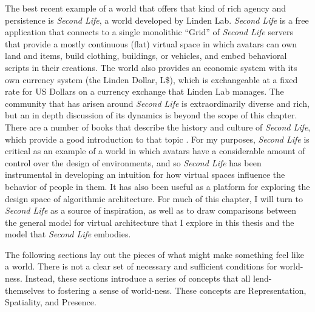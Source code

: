 The best recent example of a world that offers that kind of rich agency and persistence is \emph{Second Life}, a world developed by Linden Lab. \emph{Second Life} is a free application that connects to a single monolithic ``Grid'' of \emph{Second Life} servers that provide a mostly continuous (flat) virtual space in which avatars can own land and items, build clothing, buildings, or vehicles, and embed behavioral scripts in their creations. The world also provides an economic system with its own currency system (the Linden Dollar, L\$), which is exchangeable at a fixed rate for US Dollars on a currency exchange that Linden Lab manages. The community that has arisen around \emph{Second Life} is extraordinarily diverse and rich, but an in depth discussion of its dynamics is beyond the scope of this chapter. There are a number of books that describe the history and culture of \emph{Second Life}, which provide a good introduction to that topic \citep{Au:2008va, Ludlow:2007uu}. For my purposes, \emph{Second Life} is critical as an example of a world in which avatars have a considerable amount of control over the design of environments, and so \emph{Second Life} has been instrumental in developing an intuition for how virtual spaces influence the behavior of people in them. It has also been useful as a platform for exploring the design space of algorithmic architecture. For much of this chapter, I will turn to \emph{Second Life} as a source of inspiration, as well as to draw comparisons between the general model for virtual architecture that I explore in this thesis and the model that \emph{Second Life} embodies.

The following sections lay out the pieces of what might make something feel like a world. There is not a clear set of necessary and sufficient conditions for world-ness. Instead, these sections introduce a series of concepts that all lend-themselves to fostering a sense of world-ness. These concepts are Representation, Spatiality, and Presence. 

